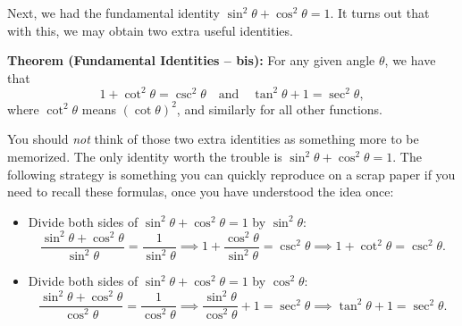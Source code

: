 \documentclass{ximera}
\begin{document}
Next, we had the fundamental identity $\sin^2\theta + \cos^2\theta = 1$. It turns out that with this, we may obtain two extra useful identities.

\begin{callout}
  {\bf Theorem (Fundamental Identities -- bis):} For any given angle $\theta$, we have that $$1 + \cot^2\theta = \csc^2\theta\quad\mbox{and}\quad \tan^2\theta + 1 = \sec^2\theta,$$where $\cot^2\theta$ means $(\cot \theta)^2$, and similarly for all other functions.
\end{callout}

You should \emph{not} think of those two extra identities as something more to be memorized. The only identity worth the trouble is $\sin^2\theta + \cos^2\theta = 1$. The following strategy is something you can quickly reproduce on a scrap paper if you need to recall these formulas, once you have understood the idea once:

\begin{itemize}
\item Divide both sides of $\sin^2\theta+\cos^2\theta = 1$ by $\sin^2\theta$: $$\frac{\sin^2\theta+\cos^2\theta}{\sin^2\theta} = \frac{1}{\sin^2\theta} \implies1 + \frac{\cos^2\theta}{\sin^2\theta} = \csc^2\theta \implies 1+\cot^2\theta = \csc^2\theta.$$
\item Divide both sides of $\sin^2\theta+\cos^2\theta = 1$ by $\cos^2\theta$:  $$\frac{\sin^2\theta+\cos^2\theta}{\cos^2\theta} = \frac{1}{\cos^2\theta} \implies \frac{\sin^2\theta}{\cos^2\theta} + 1 = \sec^2\theta \implies \tan^2\theta+1=\sec^2\theta.$$
\end{itemize}
\end{document}
